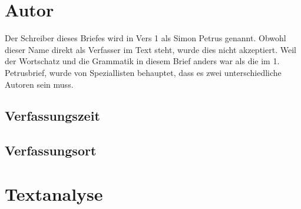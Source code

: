 \documentclass[11pt]{mybib}
\begin{document}
\tableofcontents

\section{Autor}
Der Schreiber dieses Briefes wird in Vers 1 als Simon Petrus genannt. Obwohl dieser Name direkt als Verfasser im Text steht, wurde dies nicht akzeptiert. Weil der Wortschatz und die Grammatik in diesem Brief anders war als die im 1. Petrusbrief, wurde von Speziallisten behauptet, dass es zwei unterschiedliche Autoren sein muss.
\subsection{Verfassungszeit}
\subsection{Verfassungsort}


\section{Textanalyse}
\end{document}
